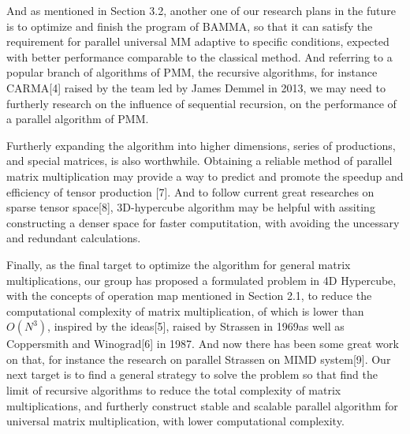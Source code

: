 \documentclass{amsart}
\theoremstyle{definition}
\theoremstyle{remark}
\numberwithin{equation}{section}
\begin{document}
	And as mentioned in Section 3.2, another one of our research plans in the future is to optimize and finish the program of BAMMA, so that it can satisfy the requirement for parallel universal MM adaptive to specific conditions, expected with better performance comparable to the classical method. And referring to a popular branch of algorithms of PMM, the recursive algorithms, for instance CARMA[4] raised by the team led by James Demmel in 2013, we may need to furtherly research on the influence of sequential recursion, on the performance of a parallel algorithm of PMM.

	Furtherly expanding the algorithm into higher dimensions, series of productions, and special matrices, is also worthwhile. Obtaining a reliable method of parallel matrix multiplication may provide a way to predict and promote the speedup and efficiency of tensor production [7]. And to follow current great researches on sparse tensor space[8], 3D-hypercube algorithm may be helpful with assiting constructing a denser space for faster computitation, with avoiding the uncessary and redundant calculations.  
	
	Finally, as the final target to optimize the algorithm for general matrix multiplications, our group has proposed a formulated problem in 4D Hypercube, with the concepts of operation map mentioned in Section 2.1, to reduce the computational complexity of matrix multiplication, of which is lower than $O(N^3)$, inspired by the ideas[5],  raised by Strassen in 1969as well as Coppersmith and Winograd[6] in 1987. And now there has been some great work on that, for instance the research on parallel Strassen on MIMD system[9]. Our next target is to find a general strategy to solve the problem so that find the limit of recursive algorithms to reduce the total complexity of matrix multiplications, and furtherly construct stable and scalable parallel algorithm for universal matrix multiplication, with lower computational complexity.
\end{document}
